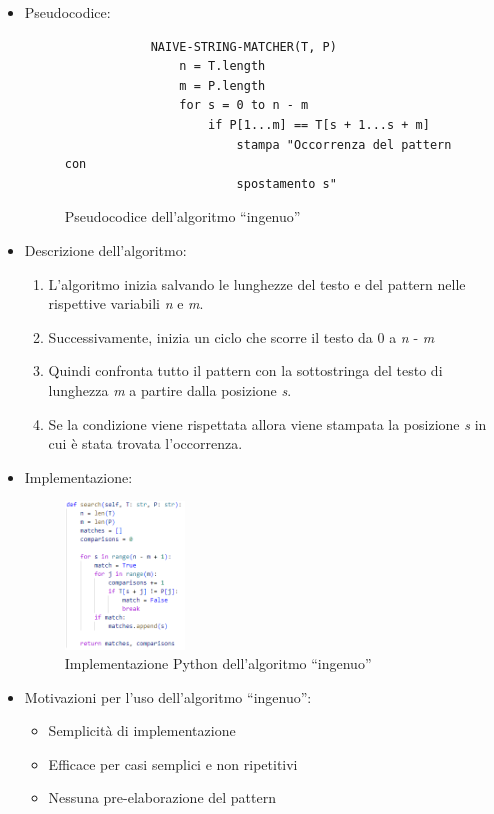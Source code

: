 \documentclass{article}
\begin{document}
\begin{itemize}
    \item Pseudocodice:
          \begin{figure}[H]
              \centering
              \begin{lstlisting}
            NAIVE-STRING-MATCHER(T, P)
                n = T.length
                m = P.length
                for s = 0 to n - m
                    if P[1...m] == T[s + 1...s + m]
                        stampa "Occorrenza del pattern con
                        spostamento s"
            \end{lstlisting}
              \caption{Pseudocodice dell'algoritmo ``ingenuo''}
              \label{fig:naive-pseudocode}
          \end{figure}
    \vspace{0.5cm}
    \item Descrizione dell'algoritmo:
          \begin{enumerate}
              \item L'algoritmo inizia salvando le lunghezze del testo e del pattern nelle rispettive variabili \textit{n} e \textit{m}.
              \item Successivamente, inizia un ciclo che scorre il testo da 0 a \textit{n} - \textit{m}
              \item Quindi confronta tutto il pattern con la sottostringa del testo di lunghezza \textit{m} a partire dalla posizione \textit{s}.
              \item Se la condizione viene rispettata allora viene stampata la posizione \textit{s} in cui è stata trovata l'occorrenza.
          \end{enumerate}
    \item Implementazione:
          \begin{figure}[H]
              \centering
              \includegraphics[width=0.3\textwidth]{img/Naive_search.png}
              \caption{Implementazione Python dell'algoritmo ``ingenuo''}
              \label{fig:naive-implementation}
          \end{figure}
    \item Motivazioni per l'uso dell'algoritmo ``ingenuo'':
          \begin{itemize}
              \item Semplicità di implementazione
              \item Efficace per casi semplici e non ripetitivi
              \item Nessuna pre-elaborazione del pattern
          \end{itemize}
\end{itemize}
\end{document}
